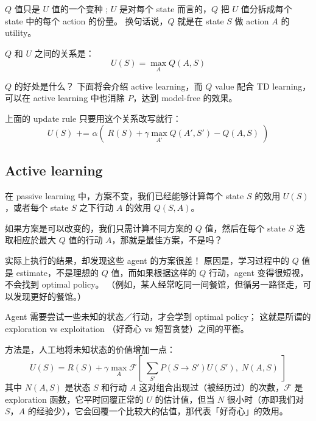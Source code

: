 \documentclass[orivec]{llncs}
\begin{document}
$Q$ 值只是 $U$ 值的一个变种 ;   $U$ 是对每个 state 而言的，$Q$ 把 $U$ 值分拆成每个 state 中的每个 action 的份量。  换句话说，$Q$ 就是在 state $S$ 做 action $A$ 的 utility。

$Q$ 和 $U$ 之间的关系是：
$$ U(S) = \max_A  Q(A, S) $$

$Q$ 的好处是什么？  下面将会介绍 active learning，而 $Q$ value  配合 TD learning，可以在 active learning 中也消除 $P$，达到 model-free 的效果。

上面的 update rule 只要用这个关系改写就行：
$$ U(S) \mbox{  +=  } \alpha ( \; R(S) + \gamma \max_{A'}  Q(A', S') - Q(A, S) \; ) $$

\subsection{Active learning}

在 passive learning 中，方案不变，我们已经能够计算每个 state $S$ 的效用 $U(S)$，或者每个 state $S$ 之下行动 $A$ 的效用 $Q(S, A)$。

如果方案是可以改变的，我们只需计算不同方案的 $Q$ 值，然后在每个 state $S$ 选取相应於最大 $Q$ 值的行动 $A$，那就是最佳方案，不是吗？

实际上执行的结果，却发现这些 agent 的方案很差！  原因是，学习过程中的 $Q$ 值是 estimate，不是理想的 $Q$ 值，而如果根据这样的 $Q$ 行动，agent 变得很短视，不会找到 optimal policy。  （例如，某人经常吃同一间餐馆，但循另一路径走，可以发现更好的餐馆。）

Agent 需要尝试一些未知的状态／行动，才会学到 optimal policy；  这就是所谓的 exploration vs exploitation （好奇心 vs 短暂贪婪）之间的平衡。

方法是，人工地将未知状态的价值增加一点：
$$ U(S) = R(S) + \gamma \max_A \mathcal{F}[ \; \sum_{S'} P(S \rightarrow S') U(S'), \; N(A, S) \; ] $$
其中 $N(A, S)$ 是状态 $S$ 和行动 $A$ 这对组合出现过（被经历过）的次数，$\mathcal{F}$ 是 exploration 函数，它平时回覆正常的 $U$ 的估计值，但当 $N$ 很小时（亦即我们对 $S$，$A$ 的经验少），它会回覆一个比较大的估值，那代表「好奇心」的效用。





\end{document}

